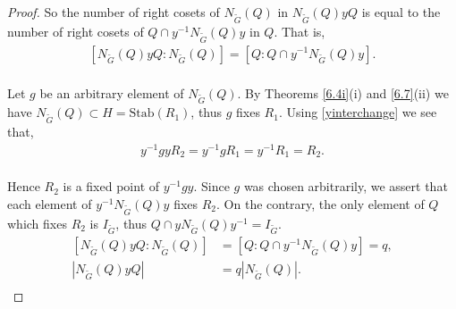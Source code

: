 \begin{proof}
So the number of right cosets of $N_{\widetilde{G}}(Q)$ in $N_{\widetilde{G}}(Q) y Q$ is equal to the number of right cosets of $Q \cap y^{-1} N_{\widetilde{G}}(Q) y$ in $Q$. That is,
\vspace{2mm}
\begin{align}\label{doublecoset} [N_{\widetilde{G}}(Q) y Q : N_{\widetilde{G}}(Q)] = [Q : Q \cap y^{-1} N_{\widetilde{G}}(Q) y]. \\ \nonumber
\end{align}

Let $g$ be an arbitrary element of $N_{\widetilde{G}}(Q)$. By Theorems \ref{6.4i}(i) and \ref{6.7}(ii) we have $N_{\widetilde{G}}(Q) \subset H = \text{Stab}(R_1)$, thus $g$ fixes $R_1$. Using \eqref{yinterchange} we see that,
\vspace{2mm}
\begin{align*} y^{-1} g y R_2 = y^{-1} g R_1 = y^{-1} R_1 = R_2. \\
\end{align*}

Hence $R_2$ is a fixed point of $y^{-1} g y$. Since $g$ was chosen arbitrarily, we assert that each element of $y^{-1} N_{\widetilde{G}}(Q) y$ fixes $R_2$. On the contrary, the only element of $Q$ which fixes $R_2$ is $I_{\widetilde{G}}$, thus $Q \cap y N_{\widetilde{G}}(Q) y^{-1} = I_{\widetilde{G}}$.
\vspace{2mm}
\begin{align}\label{qwed} [N_{\widetilde{G}}(Q) y Q : N_{\widetilde{G}}(Q)] &= [Q : Q \cap y^{-1} N_{\widetilde{G}}(Q) y] = q, \nonumber
\\[1ex] |N_{\widetilde{G}}(Q) y Q| &= q|N_{\widetilde{G}}(Q)|. \\ \nonumber
\end{align}


\end{proof}
